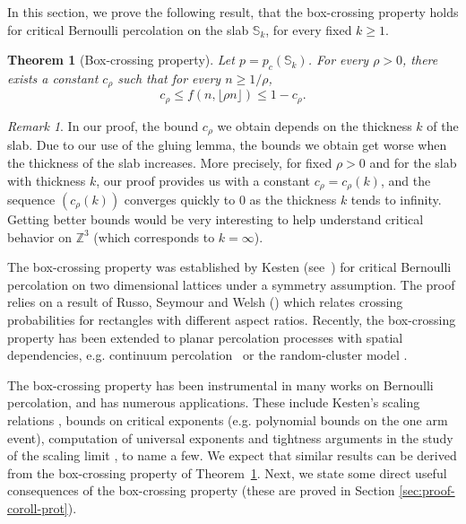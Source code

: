 \documentclass[12pt, twoside,a4paper,reqno]{amsart}
\theoremstyle{plain}
\newtheorem{theorem}{Theorem}[section]
\theoremstyle{remark}
\newtheorem*{remark}{Remark}
\theoremstyle{definition}
\begin{document}
In this section, we prove the following result, that the box-crossing property holds
for critical Bernoulli percolation on the slab $\mathbb S_k$, for every fixed
$k\ge 1$.

\begin{theorem}[Box-crossing property]
\label{thm:BXP} Let $p=p_{c}(\mathbb S_{k})$. For every $\rho >0$, there
exists a constant $c_{\rho }$ such that for every $n\geq 1/\rho $,
\begin{equation}
c_{\rho }\leq f(n,\lfloor \rho n\rfloor )\leq 1-c_{\rho }.  \label{eq:18}
\end{equation}
\end{theorem}

\begin{remark}
  In our proof, the bound $c_\rho$ we obtain depends on the thickness $k$ of the
  slab. Due to our use of the gluing lemma, the bounds we obtain get worse when
  the thickness of the slab increases. More precisely, for fixed $\rho>0$ and
  for the slab with thickness $k$, our proof provides us with a constant
  $c_\rho=c_\rho(k)$,  and the sequence $(c_\rho(k))$ converges quickly to $0$ as the
  thickness $k$ tends to infinity. Getting better bounds would be very
  interesting to help understand critical behavior on $\mathbb Z^3$
  (which corresponds to $k=\infty$).
\end{remark}

The box-crossing property was established by Kesten
(see~\cite{kesten1982percolation}) for critical Bernoulli percolation on two
dimensional lattices under a symmetry assumption. The proof relies on a result
of Russo, Seymour and Welsh (\cite{russo1978note,seymour1978percolation}) which
relates crossing probabilities for rectangles with different aspect ratios.
Recently, the box-crossing property has been extended to planar percolation
processes with spatial dependencies, e.g. continuum
percolation~\cite{tassion2015crossing,alhberg2015continuum} or the
random-cluster model \cite{duminil2015continuity}.

The box-crossing property has been instrumental in many works on Bernoulli
percolation, and has numerous applications. These include Kesten's scaling
relations \cite{kesten1987scaling}, bounds on critical exponents (e.g.
polynomial bounds on the one arm event), computation of universal
exponents and tightness arguments in the study of the scaling limit
\cite{smirnov2001critical}, to name a few. We expect that similar results can be
derived from the box-crossing property of Theorem~\ref{thm:BXP}. Next, we state
some direct useful consequences of the box-crossing property (these are proved in Section
\ref{sec:proof-coroll-prot}).
\end{document}
